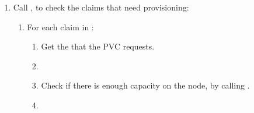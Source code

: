 \begin{algorithm}[h]
\begin{enumerate}[leftmargin=0.5cm]
            \item Call , to check the claims that need provisioning:
                  \begin{enumerate}
                        \tightlist
                        \item For each claim in  :
                              \begin{enumerate}
                                    \tightlist
                                    \item Get the  that the PVC requests.
                                    \item {}
                                    \item Check if there is enough capacity on the node, by calling .
                                    \item {}
                              \end{enumerate}
                  \end{enumerate}
      \end{enumerate}
\end{algorithm}
